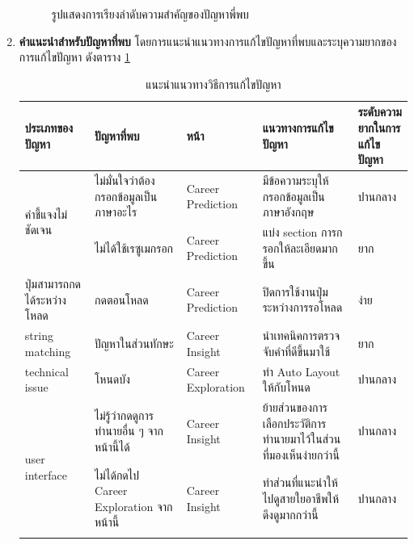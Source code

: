 \begin{enumerate}
\begin{figure}[H]
              \caption{รูปแสดงการเรียงลำดับความสำคัญของปัญหาพี่พบ}\label{fig:PrioritizeUT}
          \end{figure}
    \item \textbf{คำแนะนำสำหรับปัญหาที่พบ} โดยการแนะนำแนวทางการแก้ไขปัญหาที่พบและระบุความยากของการแก้ไขปัญหา ดังตาราง \ref{tab:recommendationsUT}
          \begin{table}[H]
              \caption{แนะนำแนวทางวิธีการแก้ไขปัญหา}
              \label{tab:recommendationsUT}
              \begin{tabularx}{\textwidth}{|l|X|l|X|X|}
                  \hline
                  \textbf{ประเภทของปัญหา}                 & \textbf{ปัญหาที่พบ}                    & \textbf{หน้า}      & \textbf{แนวทางการแก้ไขปัญหา}                          & \textbf{ระดับความยากในการแก้ไขปัญหา} \\ \hline
                  \multirow[t]{2}{*}{คำชี้แจงไม่ชัดเจน} & ไม่มั่นใจว่าต้องกรอกข้อมูลเป็นภาษาอะไร     & Career Prediction  & มีข้อความระบุให้กรอกข้อมูลเป็นภาษาอังกฤษ                  & ปานกลาง                  \\ \cline{2-5}
                                                      & ไม่ได้ใช้เรซูเมกรอก                 & Career Prediction  & แบ่ง section การกรอกให้ละเอียดมากขึ้น                  & ยาก               \\ \hline
                  ปุ่มสามารถกดได้ระหว่างโหลด                  & กดตอนโหลด                         & Career Prediction  & ปิดการใช้งานปุ่มระหว่างการรอโหลด                       & ง่าย                    \\ \hline
                  string matching                     & ปัญหาในส่วนทักษะ                  & Career Insight     & นำเทคนิคการตรวจจับคำที่ดีขึ้นมาใช้                          & ยาก               \\ \hline
                  technical issue                     & โหนดบัง                            & Career Exploration & ทำ Auto Layout ให้กับโหนด                           & ปานกลาง                  \\ \hline
                  \multirow[t]{3}{*}{user interface}  & ไม่รู้ว่ากดดูการทำนายอื่น ๆ จากหน้านี้ได้ & Career Insight     & ย้ายส่วนของการเลือกประวัติการทำนายมาไว้ในส่วนที่มองเห็นง่ายกว่านี้ & ปานกลาง                  \\ \cline{2-5}
                                                      & ไม่ได้กดไป Career Exploration จากหน้านี้                & Career Insight     & ทำส่วนที่แนะนำให้ไปดูสายใยอาชีพให้ดึงดูมากกว่านี้          & ปานกลาง                  \\ \cline{2-5}

\end{tabularx}
\end{table}
\end{enumerate}

